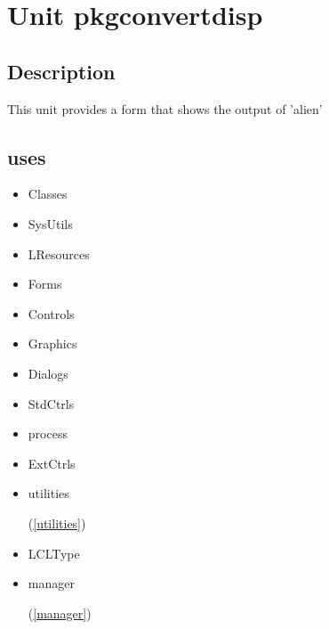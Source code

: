 \documentclass{report}
\begin{document}
\chapter{Unit pkgconvertdisp}
\label{pkgconvertdisp}
\section{Description}
This unit provides a form that shows the output of 'alien'
\section{uses}
\begin{itemize}
\item \begin{ttfamily}Classes\end{ttfamily}\item \begin{ttfamily}SysUtils\end{ttfamily}\item \begin{ttfamily}LResources\end{ttfamily}\item \begin{ttfamily}Forms\end{ttfamily}\item \begin{ttfamily}Controls\end{ttfamily}\item \begin{ttfamily}Graphics\end{ttfamily}\item \begin{ttfamily}Dialogs\end{ttfamily}\item \begin{ttfamily}StdCtrls\end{ttfamily}\item \begin{ttfamily}process\end{ttfamily}\item \begin{ttfamily}ExtCtrls\end{ttfamily}\item \begin{ttfamily}utilities\end{ttfamily}(\ref{utilities})\item \begin{ttfamily}LCLType\end{ttfamily}\item \begin{ttfamily}manager\end{ttfamily}(\ref{manager})\end{itemize}
\end{document}
